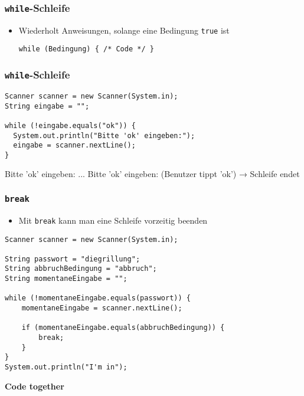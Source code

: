 \documentclass{../../presentation}
\begin{document}
\begin{frame}[fragile]
  \frametitle{\texttt{while}-Schleife}
  \pause
  \begin{itemize}
    \item  Wiederholt Anweisungen, solange eine Bedingung \texttt{true} ist
          \begin{verbatim}
while (Bedingung) { /* Code */ }
        \end{verbatim}
  \end{itemize}
\end{frame}

\begin{frame}[fragile]
  \frametitle{\texttt{while}-Schleife}
  \pause
  \begin{verbatim}
Scanner scanner = new Scanner(System.in);
String eingabe = "";

while (!eingabe.equals("ok")) {
  System.out.println("Bitte 'ok' eingeben:");
  eingabe = scanner.nextLine();
}
  \end{verbatim}
  \pause
  \begin{ausgabe}
    Bitte 'ok' eingeben: \newline
    ...\newline
    Bitte 'ok' eingeben: \newline
    (Benutzer tippt 'ok') → Schleife endet
  \end{ausgabe}
\end{frame}


\begin{frame}[fragile]
  \frametitle{\texttt{break}}
  \pause
  \begin{itemize}
    \item Mit \texttt{break} kann man eine Schleife vorzeitig beenden
  \end{itemize}
  \pause
  \begin{verbatim}
Scanner scanner = new Scanner(System.in);

String passwort = "diegrillung";
String abbruchBedingung = "abbruch";
String momentaneEingabe = "";

while (!momentaneEingabe.equals(passwort)) {
    momentaneEingabe = scanner.nextLine();

    if (momentaneEingabe.equals(abbruchBedingung)) {
        break;
    }
}
System.out.println("I'm in");
\end{verbatim}
\end{frame}


\begin{frame}[plain]
  \centering
  {\Huge\bfseries{Code together}}
\end{frame}
\end{document}
